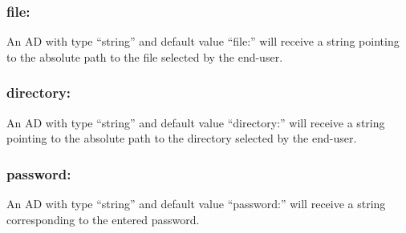 \subsubsection*{file:}
An AD with type ``string'' and default value ``file:'' will receive a string
pointing to the absolute path to the file selected by the end-user.

\subsubsection*{directory:}
An AD with type ``string'' and default value ``directory:'' will receive a string
pointing to the absolute path to the directory selected by the end-user.

\subsubsection*{password:}
An AD with type ``string'' and default value ``password:'' will receive a string
corresponding to the entered password.

